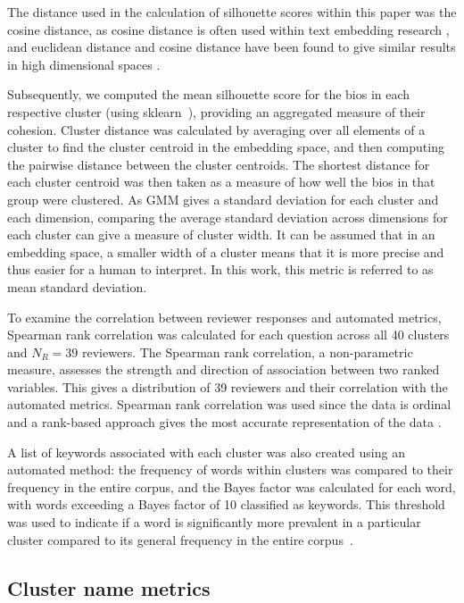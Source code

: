 \documentclass{article}
\begin{document}
The distance used in the calculation of silhouette scores within this paper was the cosine distance, as cosine distance is often used within text embedding research \cite{pan2020towards, toshevska2020comparative, bamler2017dynamic}, and euclidean distance and cosine distance have been found to give similar results in high dimensional spaces \cite{10.1145/967900.968151}.

 Subsequently, we computed the mean silhouette score for the bios in each respective cluster (using sklearn~\cite{scikit-learn}), providing an aggregated measure of their cohesion. Cluster distance was calculated by averaging over all elements of a cluster to find the cluster centroid in the embedding space, and then computing the pairwise distance between the cluster centroids.  The shortest distance for each cluster centroid was then taken as a measure of how well the bios in that group were clustered. As GMM gives a standard deviation for each cluster and each dimension, comparing the average standard deviation across dimensions for each cluster can give a measure of cluster width. It can be assumed that in an embedding space, a smaller width of a cluster means that it is more precise and thus easier for a human to interpret.  In this work, this metric is referred to as mean standard deviation.  


To examine the correlation between reviewer responses and automated metrics, Spearman rank correlation was calculated for each question across all 40 clusters and $N_R = 39$ reviewers. The Spearman rank correlation, a non-parametric measure, assesses the strength and direction of association between two ranked variables. This gives a distribution of 39 reviewers and their correlation with the automated metrics. Spearman rank correlation was used since the data is ordinal and a rank-based approach gives the most accurate representation of the data \cite{ornstein2016asymptotic}.

A list of keywords associated with each cluster was also created using an automated method: the frequency of words within clusters was compared to their frequency in the entire corpus, and the Bayes factor was calculated for each word, with words exceeding a Bayes factor of 10 classified as keywords. This threshold was used to indicate if a word is significantly more prevalent in a particular cluster compared to its general frequency in the entire corpus~\cite{wilson2013embracing}.

\subsection{Cluster name metrics}
\end{document}
